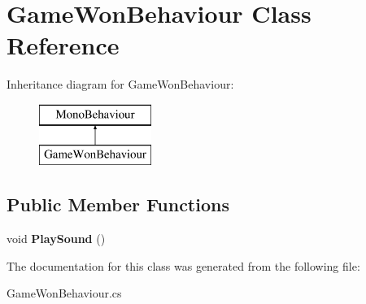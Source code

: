 \hypertarget{class_game_won_behaviour}{\section{Game\-Won\-Behaviour Class Reference}
\label{class_game_won_behaviour}
}
Inheritance diagram for Game\-Won\-Behaviour\-:\begin{figure}[H]
\begin{center}
\leavevmode
\includegraphics[height=2.000000cm]{class_game_won_behaviour}
\end{center}
\end{figure}
\subsection*{Public Member Functions}
\begin{DoxyCompactItemize}
\item 
\hypertarget{class_game_won_behaviour_a238fa3e09a1eae4d031cccac39fc7cdf}{void {\bfseries Play\-Sound} ()}\label{class_game_won_behaviour_a238fa3e09a1eae4d031cccac39fc7cdf}

\end{DoxyCompactItemize}


The documentation for this class was generated from the following file\-:\begin{DoxyCompactItemize}
\item 
Game\-Won\-Behaviour.\-cs\end{DoxyCompactItemize}
